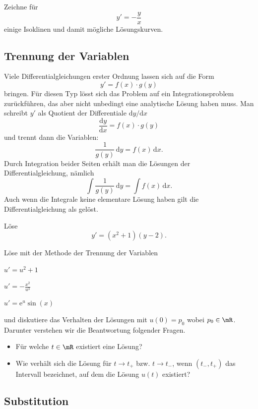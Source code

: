 \documentclass[%
draft,
11pt,%
twoside,%
titlepage,%
german,%
headsepline%
]{scrartcl}
\begin{document}
\begin{ueb}
Zeichne f\"ur
$$y'=-\frac{y}{x}$$
einige Isoklinen und damit m\"ogliche L\"osungskurven.
\end{ueb}

\subsection{Trennung der Variablen}

Viele Differentialgleichungen erster Ordnung lassen sich auf die Form
$$y'=f(x)\cdot g(y)$$
bringen.
F\"ur diesen Typ l\"osst sich das Problem auf ein Integrationsproblem zur\"uckf\"uhren, das aber nicht unbedingt eine analytische L\"osung haben muss.
Man schreibt $y'$ als Quotient der Differentiale $\mathrm{d}y/\mathrm{d}x$
$$\frac{\mathrm{d}y}{\mathrm{d}x}=f(x)\cdot g(y)$$
und trennt dann die Variablen:
$$\frac{1}{g(y)}\,\mathrm{d}y=f(x)\,\mathrm{d}x.$$
Durch Integration beider Seiten erh\"alt man die L\"osungen der Differentialgleichung, n\"amlich
$$\int\frac{1}{g(y)}\,\mathrm{d}y=\int f(x)\,\mathrm{d}x.$$
Auch wenn die Integrale keine elementare L\"osung haben gilt die Differentialgleichung als gel\"ost.

\begin{ueb}
L\"ose
$$y'=(x^2+1)(y-2).$$
\end{ueb}

\begin{ueb}
L\"ose mit der Methode der Trennung der Variablen
\begin{enumeratea}
\item $u'=u^2+1$
\item $u'=-\frac{x^2}{u^3}$
\item $u'=\mathrm{e}^u\sin(x)$
\end{enumeratea}
und diskutiere das Verhalten der L\"osungen mit $u(0)=p_0$ wobei $p_0\in\mR$. Darunter verstehen wir die Beantwortung folgender Fragen.
\begin{itemize}
\item F\"ur welche $t\in\mR$ existiert eine L\"osung?
\item Wie verh\"alt sich die L\"osung f\"ur $t\to t_+$ bzw. $t\to t_-$, wenn $(t_-,t_+)$ das Intervall bezeichnet, auf dem die L\"osung $u(t)$ existiert?
\end{itemize}
\end{ueb}

\subsection{Substitution}
\end{document}
